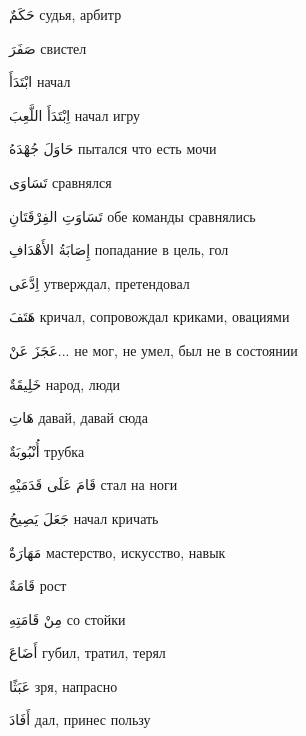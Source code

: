 \documentclass[a5paper]{article}
\newcommand\textstyleDropCaps[1]{#1}
\newcommand\textstyleCaptioncharacters[1]{#1}
\begin{document}
\textstyleCaptioncharacters{حَكَمٌ }\textstyleDropCaps{судья, арбитр‎}

\textstyleCaptioncharacters{صَفَرَ }\textstyleDropCaps{свистел‎}

\textstyleCaptioncharacters{ابْتَدَأَ }\textstyleDropCaps{начал‎}

\textstyleCaptioncharacters{اِبْتَدَأَ اللَّعِبَ }\textstyleDropCaps{начал игру‎}

\textstyleCaptioncharacters{حَاوَلَ جُهْدَهُ }\textstyleDropCaps{пытался что есть мочи‎}

\textstyleCaptioncharacters{تَسَاوَى }\textstyleDropCaps{сравнялся‎}

\textstyleCaptioncharacters{تَسَاوَتِ الفِرْقَتَانِ }\textstyleDropCaps{обе команды сравнялись‎}

\textstyleCaptioncharacters{إِصَابَةُ الأَهْدَافِ }\textstyleDropCaps{попада­ние в цель, гол‎}

\textstyleCaptioncharacters{اِدَّعَى }\textstyleDropCaps{утверждал, претен­довал ‎}

\textstyleCaptioncharacters{هَتَفَ }\textstyleDropCaps{кричал, сопрово­ждал криками, овациями‎}

\textstyleCaptioncharacters{عَجَزَ عَنْ... }\textstyleDropCaps{не мог, не умел, был не в состоянии‎}

\textstyleCaptioncharacters{خَلِيقَةٌ }\textstyleDropCaps{народ, люди‎}

\textstyleCaptioncharacters{هَاتِ }\textstyleDropCaps{давай, давай сюда‎}

\textstyleCaptioncharacters{أُنْبُوبَةٌ }\textstyleDropCaps{трубка‎}

\textstyleCaptioncharacters{قَامَ عَلَى قَدَمَيْهِ }\textstyleDropCaps{стал на ноги‎}

\textstyleCaptioncharacters{جَعَلَ يَصِيحُ }\textstyleDropCaps{начал кри­чать‎}

\textstyleCaptioncharacters{مَهَارَةٌ }\textstyleDropCaps{мастерство, искус­ство, навык‎}

\textstyleCaptioncharacters{قَامَةٌ }\textstyleDropCaps{рост‎}

\textstyleCaptioncharacters{مِنْ قَامَتِهِ }\textstyleDropCaps{со стойки‎}

\textstyleCaptioncharacters{أَضَاعَ }\textstyleDropCaps{губил, тратил, терял‎}

\textstyleCaptioncharacters{عَبَثًا }\textstyleDropCaps{зря, напрасно‎}

\textstyleCaptioncharacters{أَفَادَ }\textstyleDropCaps{дал, принес пользу‎}
\end{document}
